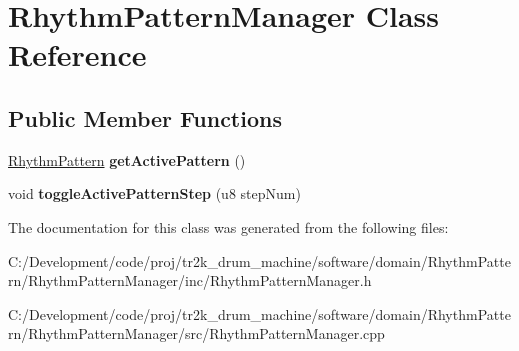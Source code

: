 \hypertarget{class_rhythm_pattern_manager}{}\section{Rhythm\+Pattern\+Manager Class Reference}
\label{class_rhythm_pattern_manager}
\subsection*{Public Member Functions}
\begin{DoxyCompactItemize}
\item 
\mbox{\label{class_rhythm_pattern_manager_ad6c1213a26fba24bccf0c62752dd94fb}} 
\mbox{\hyperlink{struct_rhythm_pattern}{Rhythm\+Pattern}} {\bfseries get\+Active\+Pattern} ()
\item 
\mbox{\label{class_rhythm_pattern_manager_acb04ad17a668a3137ee7892633f8e059}} 
void {\bfseries toggle\+Active\+Pattern\+Step} (u8 step\+Num)
\end{DoxyCompactItemize}


The documentation for this class was generated from the following files\+:\begin{DoxyCompactItemize}
\item 
C\+:/\+Development/code/proj/tr2k\+\_\+drum\+\_\+machine/software/domain/\+Rhythm\+Pattern/\+Rhythm\+Pattern\+Manager/inc/Rhythm\+Pattern\+Manager.\+h\item 
C\+:/\+Development/code/proj/tr2k\+\_\+drum\+\_\+machine/software/domain/\+Rhythm\+Pattern/\+Rhythm\+Pattern\+Manager/src/Rhythm\+Pattern\+Manager.\+cpp\end{DoxyCompactItemize}
